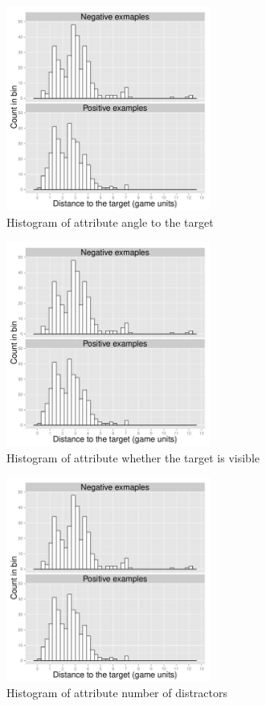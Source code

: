 \begin{figure}[!htbp]
  \centering
	\includegraphics[page=2,width=0.6\textwidth]{Images/fref_distrib}
	\caption{Histogram of attribute angle to the target}
	\label{fig:fref-distrib-angle}
\end{figure}

\begin{figure}[!htbp]
  \centering
	\includegraphics[page=3,width=0.6\textwidth]{Images/fref_distrib}
	\caption{Histogram of attribute whether the target is visible}
	\label{fig:fref-distrib-visib}
\end{figure}

\begin{figure}[!htbp]
  \centering
	\includegraphics[page=4,width=0.6\textwidth]{Images/fref_distrib}
	\caption{Histogram of attribute number of distractors}
	\label{fig:fref-distrib-distractors}
\end{figure}

